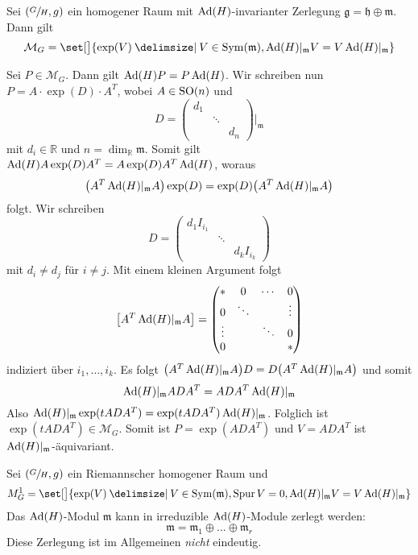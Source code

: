 \begin{satz}[label=satz:3210,{name=[Raum M als Bild der Exponentialabbildung]}]
	Sei $\enbrace*{\sfrac{G}{H},g}$ ein homogener Raum mit $\Ad(H)$-invarianter Zerlegung $\mathfrak{g} = \mathfrak{h} \oplus \mathfrak{m}$.
	Dann gilt
	\[
		\mathcal{M}_G = \set[\big]{\exp(V) \given V \in \Sym(\mathfrak{m}), \Ad(H)|_\mathfrak{m} V = V \Ad(H)|_{\mathfrak{m}}}
	\]
\end{satz}
\begin{beweis}
	Sei $P \in \mathcal{M}_G$.
	Dann gilt $\Ad(H)P = P\Ad(H)$.
	Wir schreiben nun $P = A \cdot \exp(D) \cdot A^T$, wobei $A \in \SO(n)$ und
	\[
		D = \begin{pmatrix}
			d_1 & & \\
			& \ddots & \\
			& & d_n
		\end{pmatrix} \Big|_{\mathfrak{m}}
	\]
	mit $d_i \in \mathbb{R}$ und $n = \dim_\mathbb{R} \mathfrak{m}$.
	Somit gilt $\Ad(H) A \exp(D) A^T = A \exp(D)A^T \Ad(H)$, woraus
	\[
		\enbrace*{A^T \Ad(H)|_\mathfrak{m} A} \exp(D) = \exp(D) \enbrace*{A^T \Ad(H)|_\mathfrak{m} A}
	\]
	folgt. Wir schreiben 
	\[
		D = \begin{pmatrix}
			d_1 I_{i_1} & & \\
			& \ddots & \\
			& & d_k I_{i_k}
		\end{pmatrix}
	\]
	mit $d_i \neq d_j$ für $i \neq j$.
	Mit einem kleinen Argument folgt
	\[
		\benbrace*{A^T \Ad(H)|_\mathfrak{m} A} = \begin{pmatrix}
			* & 0 & \cdots & 0 \\
			0 & \ddots & & \vdots \\
			\vdots & & \ddots & 0 \\
			0 & & & *
		\end{pmatrix}
	\]
	indiziert über $i_1, \ldots , i_k$.
	Es folgt $\enbrace*{A^T \Ad(H)|_\mathfrak{m} A} D = D \enbrace*{A^T \Ad(H)|_\mathfrak{m} A}$ und somit
	\[
		\Ad(H)|_\mathfrak{m} A D A^T = A DA^T \Ad(H)|_\mathfrak{m}
	\]
	Also $\Ad(H)|_\mathfrak{m} \exp(t ADA^T) = \exp(t A D A^T) \Ad(H)|_{\mathfrak{m}}$.
	Folglich ist $\exp(t A DA^T) \in  \mathcal{M}_G$.
	Somit ist $P = \exp(A D A^T)$ und $V= A DA^T$ ist $\Ad(H)|_\mathfrak{m}$-äquivariant.
\end{beweis}

\begin{korollarB}[label=korr:3211,{name=[Zerlegung des $\Ad(H)$-Moduls]}]
	Sei $\enbrace*{\sfrac{G}{H}, g}$ ein Riemannscher homogener Raum und 
	\[
		M_G^1 = \set[\big]{\exp(V) \given V \in \Sym(\mathfrak{m}), \operatorname{Spur} V =0, \Ad(H)|_\mathfrak{m} V = V \Ad(H)|_\mathfrak{m}}
	\]
	Das $\Ad(H)$-Modul $\mathfrak{m}$ kann in irreduzible $\Ad(H)$-Module zerlegt werden:
	\[
		\mathfrak{m} = \mathfrak{m}_1 \oplus \ldots \oplus \mathfrak{m}_r
	\]
	Diese Zerlegung ist im Allgemeinen \emph{nicht} eindeutig.
\end{korollarB}

